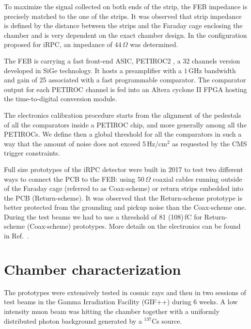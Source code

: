 \documentclass{PoS}
\newcommand{\hzcm}{\mathrm{Hz/cm^2}}
\begin{document}
To maximize the signal collected on both ends of the strip, the FEB impedance is precisely matched to the one of the strips. It was observed that strip impedance is defined by the distance between the strips and the Faraday cage enclosing the chamber and is very dependent on the exact chamber design. In the configuration proposed for iRPC, an impedance of $44\,\Omega$ was determined.

The FEB is carrying a fast front-end ASIC, PETIROC2 \cite{PETIROC2}, a 32 channels version developed in SiGe technology. It hosts a preamplifier with a $1$\,GHz bandwidth and gain of 25 associated with a fast programmable comparator. The comparator output for each PETIROC channel is fed into an Altera cyclone II FPGA hosting the time-to-digital conversion module.

The electronics calibration procedure starts from the alignment of the pedestals of all the comparators inside a PETIROC chip, and more generally among all the PETIROCs. We define then a global threshold for all the comparators in such a way that the amount of noise does not exceed 5\,$\hzcm$ as requested by the CMS trigger constraints.

Full size prototypes of the iRPC detector were built in 2017 to test two different ways to connect the PCB to the FEB: using $50$\,$\Omega$ coaxial cables running outside of the Faraday cage (referred to as Coax-scheme) or return strips embedded into the PCB (Return-scheme). It was observed that the Return-scheme prototype is better protected from the grounding and pickup noise than the Coax-scheme one. During the test beams we had to use a threshold of 81 (108)\,fC for Return-scheme (Coax-scheme) prototypes. More details on the electronics can be found in Ref.~\cite{Combaret}.

\section{Chamber characterization}

The prototypes were extensively tested in cosmic rays and then in two sessions of test beams in the Gamma Irradiation Facility (GIF++) \cite{Jaekel:2014yya} during 6 weeks. A low intensity muon beam was hitting the chamber together with a uniformly distributed photon background generated by a $^{137}$Cs source.
\end{document}
